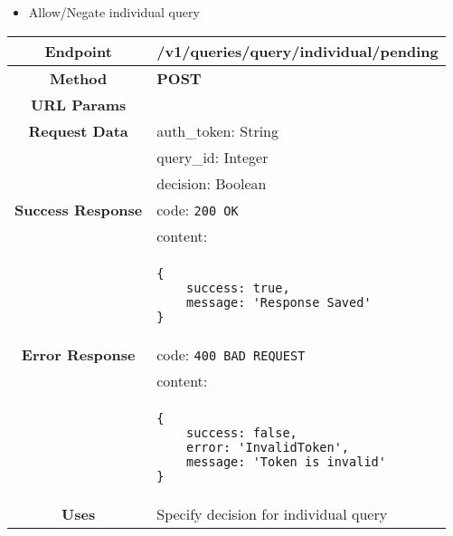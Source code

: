     \begin{itemize}
        \item Allow/Negate individual query
    \end{itemize}
    \begin{adjustwidth}{1cm}{}
        \begin{longtable}{|c|l|}
            \hline
            \textbf{Endpoint} & /v1/queries/query/individual/pending \\
            \hline
            \textbf{Method} & \textbf{POST} \\
            \hline
            \textbf{URL Params} &  \\
            \hline
            \textbf{Request Data} &  auth\_token: String \\
            & query\_id: Integer \\
            & decision: Boolean \\
            \hline
            \textbf{Success Response} & code: \texttt{200 OK} \\
            &                           content: \\
            & \begin{minipage}[t]{0.5\textwidth}
                \begin{adjustwidth}{1.5cm}{}
                \begin{verbatim}
{
    success: true, 
    message: 'Response Saved'
}
                \end{verbatim}
                \end{adjustwidth}
              \end{minipage} \\
              \hline
            \textbf{Error Response} & code: \texttt{400 BAD REQUEST} \\
              &                     content: \\
              & \begin{minipage}[t]{0.7\textwidth}
                \begin{adjustwidth}{1.5cm}{}
                \begin{verbatim}
{
    success: false, 
    error: 'InvalidToken',
    message: 'Token is invalid'
}
                \end{verbatim}
                \end{adjustwidth}
                 \vspace{4pt}
              \end{minipage} \\
              \hline
            \textbf{Uses} & Specify decision for individual query \\
            \hline
            

\end{longtable}
\end{adjustwidth}
